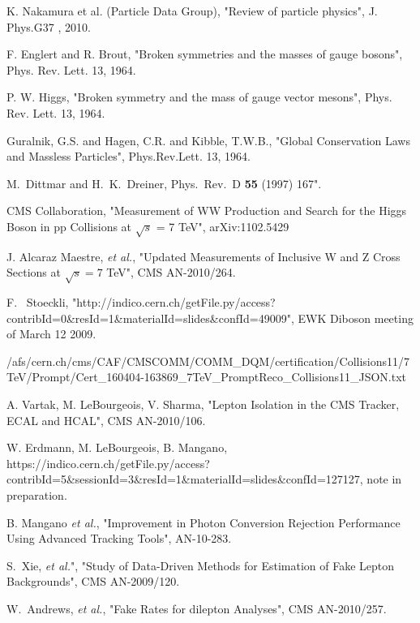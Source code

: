 \clearpage

\vspace*{-0.2cm}

 K. Nakamura et al. (Particle Data Group), "Review of particle physics", J. Phys.G37 , 2010.

F. Englert and R. Brout, "Broken symmetries and the masses of gauge bosons", Phys. Rev. Lett. 13,  1964.

P. W. Higgs, "Broken symmetry and the mass of gauge vector mesons", Phys. Rev. Lett. 13, 1964.

Guralnik, G.S. and Hagen, C.R. and Kibble, T.W.B., "Global Conservation Laws and Massless Particles", 
Phys.Rev.Lett. 13, 1964.

M.~Dittmar and H.~K.~Dreiner, Phys.\ Rev.\  D {\bf 55} (1997) 167".

CMS Collaboration, "Measurement of WW Production and Search for the Higgs Boson in 
pp Collisions at $\sqrt{s}$ = 7 TeV", arXiv:1102.5429

J. Alcaraz Maestre, \textit{et al.}, "Updated Measurements of Inclusive W and Z Cross Sections 
at $\sqrt{s}=7$ TeV", CMS AN-2010/264.

F.~ Stoeckli, "http://indico.cern.ch/getFile.py/access?contribId=0\&resId=1\&materialId=slides\&confId=49009", 
EWK Diboson meeting of March 12 2009.

{\small
/afs/cern.ch/cms/CAF/CMSCOMM/COMM\_DQM/certification/Collisions11/7TeV/Prompt/Cert\_160404-163869\_7TeV\_PromptReco\_Collisions11\_JSON.txt
}

A. Vartak, M. LeBourgeois, V. Sharma, "Lepton Isolation in the CMS Tracker, ECAL and HCAL", CMS AN-2010/106.

W. Erdmann, M. LeBourgeois, B. Mangano, 
https://indico.cern.ch/getFile.py/access?contribId=5\&sessionId=3\&resId=1\&materialId=slides\&confId=127127, 
note in preparation.

B. Mangano \textit{et al.}, "Improvement in Photon Conversion Rejection Performance Using 
Advanced Tracking Tools", AN-10-283.

S.~Xie, \textit{et al.}", "Study of Data-Driven Methods for Estimation of Fake Lepton Backgrounds", 
CMS AN-2009/120.

W.~Andrews, \textit{et al.}, "Fake Rates for dilepton Analyses", CMS AN-2010/257.

